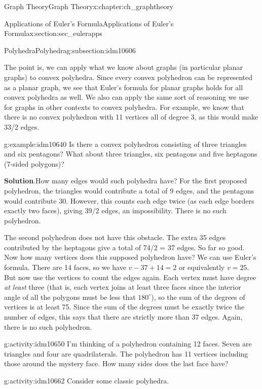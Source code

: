 \documentclass[oneside,10pt,]{book}
\numberwithin{equation}{chapter}
\begin{document}
\begin{chapterptx}{Graph Theory}{}{Graph Theory}{}{}{x:chapter:ch_graphtheory}
\begin{sectionptx}{Applications of Euler's Formula}{}{Applications of Euler's Formula}{}{}{x:section:sec_eulerapps}
\begin{subsectionptx}{Polyhedra}{}{Polyhedra}{}{}{g:subsection:idm10606}
\par
The point is, we can apply what we know about graphs (in particular planar graphs) to convex polyhedra. Since every convex polyhedron can be represented as a planar graph, we see that Euler's formula for planar graphs holds for all convex polyhedra as well. We also can apply the same sort of reasoning we use for graphs in other contexts to convex polyhedra. For example, we know that there is no convex polyhedron with 11 vertices all of degree 3, as this would make 33\slash{}2 edges.%
\begin{example}{}{g:example:idm10640}%
Is there a convex polyhedron consisting of three triangles and six pentagons? What about three triangles, six pentagons and five heptagons (7-sided polygons)?%
\par\smallskip%
\noindent\textbf{Solution}.\hypertarget{g:solution:idm10643}{}\quad{}How many edges would such polyhedra have? For the first proposed polyhedron, the triangles would contribute a total of 9 edges, and the pentagons would contribute 30. However, this counts each edge twice (as each edge borders exactly two faces), giving 39\slash{}2 edges, an impossibility. There is no such polyhedron.%
\par
The second polyhedron does not have this obstacle. The extra 35 edges contributed by the heptagons give a total of 74\slash{}2 = 37 edges. So far so good. Now how many vertices does this supposed polyhedron have? We can use Euler's formula. There are 14 faces, so we have \(v - 37 + 14 = 2\) or equivalently \(v = 25\). But now use the vertices to count the edges again. Each vertex must have degree \emph{at least} three (that is, each vertex joins at least three faces since the interior angle of all the polygons must be less that \(180^\circ\)), so the sum of the degrees of vertices is at least 75. Since the sum of the degrees must be exactly twice the number of edges, this says that there are strictly more than 37 edges. Again, there is no such polyhedron.%
\end{example}
\begin{activity}{}{g:activity:idm10650}%
I'm thinking of a polyhedron containing 12 faces. Seven are triangles and four are quadrilaterals. The polyhedron has 11 vertices including those around the mystery face. How many sides does the last face have?%
\end{activity}
\begin{activity}{}{g:activity:idm10662}%
Consider some classic polyhedra.%
\begin{enumerate}[font=\bfseries,label=(\alph*),ref=\alph*]

\end{enumerate}
\end{activity}
\end{subsectionptx}
\end{sectionptx}
\end{chapterptx}
\end{document}
